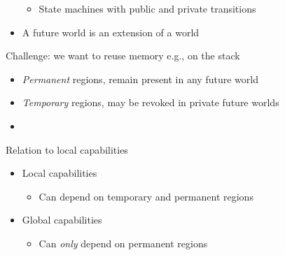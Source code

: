 \documentclass{beamer}
\begin{document}
\begin{frame}
\begin{overprint}
\begin{itemize}
      \begin{itemize}
      \item State machines with public and private transitions
      \end{itemize}
    \item<3-> A future world is an extension of a world
    \end{itemize}
    Challenge: we want to reuse memory e.g., on the stack
      \begin{itemize}[<5-8>]
      \item \emph{Permanent} regions, remain present in any future world
      \item \emph{Temporary} regions, may be revoked in private future worlds
      \item {}
      \end{itemize}
    Relation to local capabilities
    \begin{itemize}
    \item<9-> Local capabilities
      \begin{itemize}
      \item Can depend on temporary and permanent regions
      \end{itemize}
    \item<10-> Global capabilities
      \begin{itemize}
      \item Can \emph{only} depend on permanent regions
      \end{itemize}
    \end{itemize}
  \end{overprint}
\end{frame}
\end{document}
